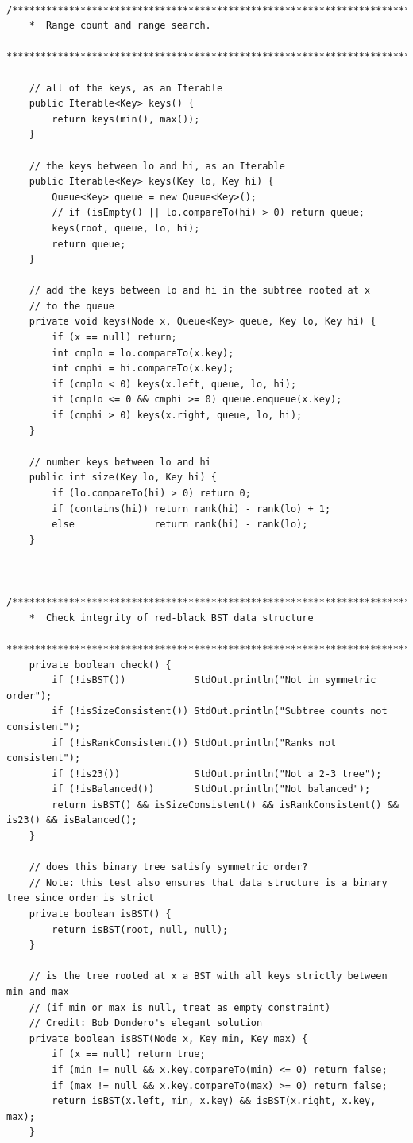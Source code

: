 \documentclass{article}
\begin{document}
\begin{lstlisting}
   /***********************************************************************
    *  Range count and range search.
    ***********************************************************************/

    // all of the keys, as an Iterable
    public Iterable<Key> keys() {
        return keys(min(), max());
    }

    // the keys between lo and hi, as an Iterable
    public Iterable<Key> keys(Key lo, Key hi) {
        Queue<Key> queue = new Queue<Key>();
        // if (isEmpty() || lo.compareTo(hi) > 0) return queue;
        keys(root, queue, lo, hi);
        return queue;
    } 

    // add the keys between lo and hi in the subtree rooted at x
    // to the queue
    private void keys(Node x, Queue<Key> queue, Key lo, Key hi) { 
        if (x == null) return; 
        int cmplo = lo.compareTo(x.key); 
        int cmphi = hi.compareTo(x.key); 
        if (cmplo < 0) keys(x.left, queue, lo, hi); 
        if (cmplo <= 0 && cmphi >= 0) queue.enqueue(x.key); 
        if (cmphi > 0) keys(x.right, queue, lo, hi); 
    } 

    // number keys between lo and hi
    public int size(Key lo, Key hi) {
        if (lo.compareTo(hi) > 0) return 0;
        if (contains(hi)) return rank(hi) - rank(lo) + 1;
        else              return rank(hi) - rank(lo);
    }


   /*************************************************************************
    *  Check integrity of red-black BST data structure
    *************************************************************************/
    private boolean check() {
        if (!isBST())            StdOut.println("Not in symmetric order");
        if (!isSizeConsistent()) StdOut.println("Subtree counts not consistent");
        if (!isRankConsistent()) StdOut.println("Ranks not consistent");
        if (!is23())             StdOut.println("Not a 2-3 tree");
        if (!isBalanced())       StdOut.println("Not balanced");
        return isBST() && isSizeConsistent() && isRankConsistent() && is23() && isBalanced();
    }

    // does this binary tree satisfy symmetric order?
    // Note: this test also ensures that data structure is a binary tree since order is strict
    private boolean isBST() {
        return isBST(root, null, null);
    }

    // is the tree rooted at x a BST with all keys strictly between min and max
    // (if min or max is null, treat as empty constraint)
    // Credit: Bob Dondero's elegant solution
    private boolean isBST(Node x, Key min, Key max) {
        if (x == null) return true;
        if (min != null && x.key.compareTo(min) <= 0) return false;
        if (max != null && x.key.compareTo(max) >= 0) return false;
        return isBST(x.left, min, x.key) && isBST(x.right, x.key, max);
    } 


\end{lstlisting}
\end{document}
